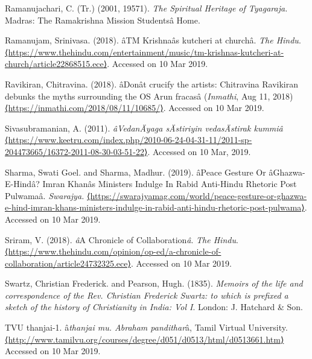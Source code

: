\begin{thebibliography}{99}
  Ramanujachari, C. (Tr.) (2001, 19571). \textit{The Spiritual Heritage of Tyagaraja. }Madras: The Ramakrishna Mission Studentsâ Home.

  Ramanujam, Srinivasa. (2018). âTM Krishnaâs kutcheri at churchâ. \textit{The Hindu}. \url{⟨https://www.thehindu.com/entertainment/music/tm-krishnas-kutcheri-at-church/article22868515.ece⟩}. Accessed on 10 Mar 2019.

  Ravikiran, Chitravina. (2018). âDonât crucify the artists: Chitravina Ravikiran debunks the myths surrounding the OS Arun fracasâ (\textit{Inmathi}, Aug 11, 2018) \url{⟨https://inmathi.com/2018/08/11/10685/⟩}. Accessed on 10 Mar 2019.

  Sivasubramanian, A. (2011). \textit{âVedanÄyaga sÄstiriyin vedasÄstirak kummiâ} \url{⟨https://www.keetru.com/index.php/2010-06-24-04-31-11/2011-sp-204473665/16372-2011-08-30-03-51-22⟩}. Accessed on 10 Mar, 2019.

  Sharma, Swati Goel. and Sharma, Madhur. (2019). âPeace Gesture Or âGhazwa-E-Hindâ? Imran Khanâs Ministers Indulge In Rabid Anti-Hindu Rhetoric Post Pulwamaâ. \textit{Swarajya.} \url{⟨https://swarajyamag.com/world/peace-gesture-or-ghazwa-e-hind-imran-khans-ministers-indulge-in-rabid-anti-hindu-rhetoric-post-pulwama⟩}. Accessed on 10 Mar 2019.

  Sriram, V. (2018). \textit{â}A Chronicle of Collaboration\textit{â}. \textit{The Hindu}. \url{⟨https://www.thehindu.com/opinion/op-ed/a-chronicle-of-collaboration/article24732325.ece⟩}. Accessed on 10 Mar 2019.

  Swartz, Christian Frederick. and Pearson, Hugh. (1835). \textit{Memoirs of the life and correspondence of the Rev. Christian Frederick Swartz: to which is prefixed a sketch of the history of Christianity in India: Vol I}. London: J. Hatchard \& Son.

  TVU thanjai-1. â\textit{thanjai mu. Abraham pandithar}â, Tamil Virtual University. \url{⟨http://www.tamilvu.org/courses/degree/d051/d0513/html/d0513661.htm⟩} Accessed on 10 Mar 2019.

 \end{thebibliography}

\theendnotes




